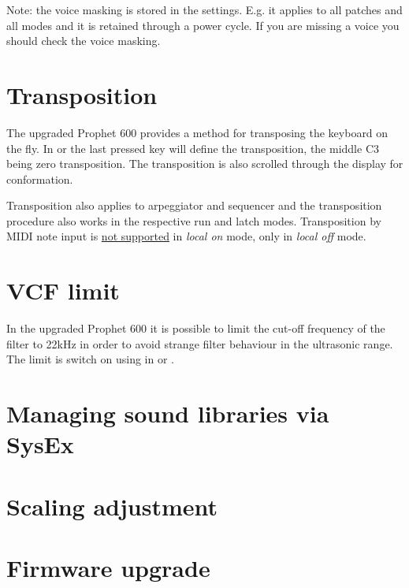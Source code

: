 \documentclass[landscape, 11pt, oneside]{report}
\newenvironment{flowtext}{\addmargin[0cm]{7cm}}{\endaddmargin} %
\begin{document}
\begin{flowtext}
Note: the voice masking is stored in the settings. E.g. it applies to all patches and all modes and it is retained through a power cycle. If you are missing a voice you should check the voice masking.

\section{Transposition}\label{transposition}

The upgraded Prophet 600 provides a method for transposing the keyboard on the fly. In \shiftmode or \shiftlock the last pressed key will define the transposition, the middle C3 being zero transposition. The transposition is also scrolled through the display for conformation. 

Transposition also applies to arpeggiator and sequencer and the transposition procedure also works in the respective run and latch modes. Transposition by MIDI note input is \underline{not supported} in \textit{local on} mode, only in \textit{local off} mode. 

\section{VCF limit}\label{limitsett}

In the upgraded Prophet 600 it is possible to limit the cut-off frequency of the filter to 22kHz in order to avoid strange filter behaviour in the ultrasonic range. The limit is switch on using  in \shiftmode or \shiftlock. 

\section{Managing sound libraries via SysEx}\label{patchmgmt}



\section{Scaling adjustment}\label{scalingadj}



\section{Firmware upgrade}\label{fwupgrade}

  

\end{flowtext}
\end{document}
